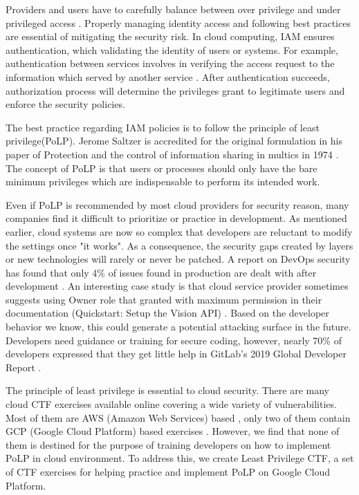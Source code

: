 \documentclass[sigconf]{acmart}
\begin{document}
Providers and users have to carefully balance between over privilege and under privileged access \cite{Sanders2018}. Properly managing identity access and following best practices are essential of mitigating the security risk. 
In cloud computing, 
IAM ensures authentication, which validating the identity of users or systems. For example, authentication between services involves in verifying the access request to the information which served by another service \cite{AlmullaSameeraAbdulrahmanandYeun2010}.
After authentication succeeds, authorization process will determine the privileges grant to legitimate users and enforce the security policies.


The best practice regarding IAM policies is to follow the principle of least privilege(PoLP). Jerome Saltzer is accredited for the original formulation in  his paper of  Protection and the control of information sharing in multics in 1974 \cite{Saltzer1974}. The concept of PoLP is that users or processes should only have the bare minimum privileges which are indispensable to perform its intended work.

Even if PoLP is recommended by most cloud providers for security reason, many companies find it difficult to prioritize or practice in development. 
As mentioned earlier, cloud systems are now so complex that developers are reluctant to modify the settings once "it works". As a consequence, the security gaps created by layers or new technologies will rarely or never be patched. A report on DevOps security has found that only 4\% of issues found in production are dealt with after development \cite{Foremski}. 
An interesting case study is that cloud service provider sometimes suggests using Owner role that granted with maximum permission in their documentation (Quickstart: Setup the Vision API) \cite{GoogleVis}. Based on the developer behavior we know, this could generate a potential attacking surface in the future.
Developers need guidance or training for secure coding, however, nearly 70\% of developers expressed that they get little help in GitLab's 2019 Global Developer Report  \cite{Gitlab2019}.

The principle of least privilege is essential to cloud security. There are many cloud CTF exercises available online covering a wide variety of vulnerabilities. Most of them are AWS (Amazon Web Services) based \cite{flaws} \cite{flaws2} \cite{cloudgoat} \cite{serverlessgoat}, only two of them contain  GCP (Google Cloud Platform) based exercises \cite{thunder-ctf} \cite{QWIKLABS}.  However, we find that none of them is destined for the purpose of   training developers on how to implement PoLP in cloud environment. To address this, we create Least Privilege CTF, a set of CTF exercises for helping practice and implement PoLP on Google Cloud Platform.
\end{document}
